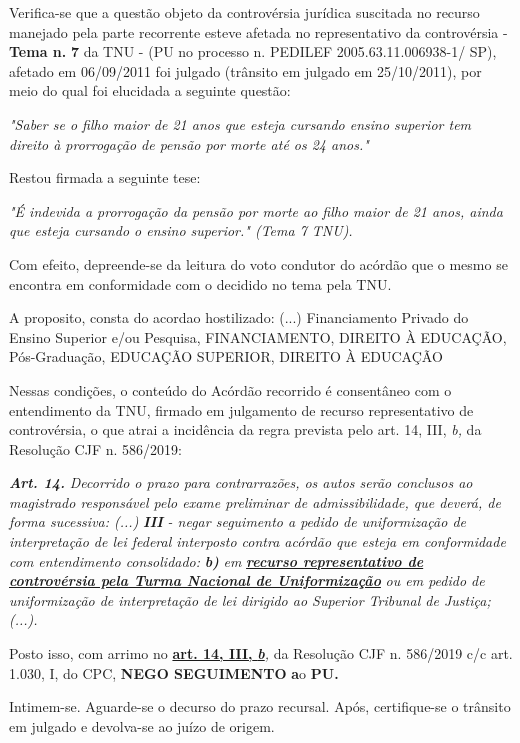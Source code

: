 \documentclass[12pt]{article}
\begin{document}
\justifying
\noindent Verifica-se que a questão objeto da controvérsia jurídica suscitada no recurso manejado pela parte recorrente esteve afetada no representativo da controvérsia - \textbf{Tema n. }\textbf{7} da TNU - (PU no processo n. PEDILEF 2005.63.11.006938-1/ SP),  afetado em 06/09/2011 foi julgado (trânsito em julgado em 25/10/2011), por meio do qual foi elucidada a seguinte questão:

\noindent \textit{"Saber se o filho maior de 21 anos que esteja cursando ensino superior tem direito à prorrogação de pensão por morte até os 24 anos."}

\noindent Restou firmada a seguinte tese:

\noindent \textit{"É indevida a prorrogação da pensão por morte ao filho maior de 21 anos, ainda que esteja cursando o ensino superior." (Tema 7 TNU).}

\noindent Com efeito, depreende-se da leitura do voto condutor do acórdão que o mesmo se encontra em conformidade com o decidido no  tema pela TNU.

\noindent A proposito, consta do acordao hostilizado: (...) Financiamento Privado do Ensino Superior e/ou Pesquisa, FINANCIAMENTO, DIREITO À EDUCAÇÃO, Pós-Graduação, EDUCAÇÃO SUPERIOR, DIREITO À EDUCAÇÃO

\noindent Nessas condições, o conteúdo do Acórdão recorrido é consentâneo com o entendimento da TNU, firmado em julgamento de recurso representativo de controvérsia, o que atrai a incidência da regra prevista pelo art. 14, III, \textit{b,} da Resolução CJF n. 586/2019:

\noindent \textit{\textbf{Art. 14.}}\textit{ Decorrido o prazo para contrarrazões, os autos serão conclusos ao magistrado responsável pelo exame preliminar de admissibilidade, que deverá, de forma sucessiva: (...) }\textit{\textbf{III }}\textit{- negar seguimento a pedido de uniformização de interpretação de lei federal interposto contra acórdão que esteja em conformidade com entendimento consolidado: }\textit{\textbf{b)}}\textit{ em }\uline{\textit{\textbf{recurso representativo de controvérsia pela Turma Nacional de Uniformização}}}\textit{ ou em pedido de uniformização de interpretação de lei dirigido ao Superior Tribunal de Justiça;(...).}

\noindent Posto isso, com arrimo no \uline{\textbf{art. 14, III, }}\uline{\textit{\textbf{b}}}\textit{,} da Resolução CJF n. 586/2019 c/c art. 1.030, I, do CPC, \textbf{NEGO SEGUIMENTO }\textbf{a}o\textbf{ PU}\textbf{.}

\noindent Intimem-se. Aguarde-se o decurso do prazo recursal. Após, certifique-se o trânsito em julgado e devolva-se ao juízo de origem.
\end{document}
